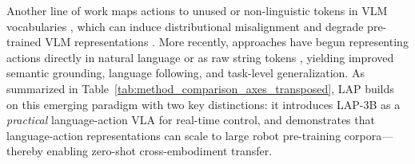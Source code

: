 Another line of work maps actions to unused or non-linguistic tokens in VLM vocabularies \cite{brohan2023rt2visionlanguageactionmodelstransfer, kim2024openvlaopensourcevisionlanguageactionmodel, pertsch2025fastefficientactiontokenization, liu2025fasterefficientautoregressivevision}, which can induce distributional misalignment and degrade pre-trained VLM representations \cite{hancock2025actionslanguagefinetuningvlms}. More recently, approaches have begun representing actions directly in natural language \cite{hancock2025actionslanguagefinetuningvlms} or as raw string tokens \cite{goyal2025vla0buildingstateoftheartvlas, grover2025enhancinggeneralizationvisionlanguageactionmodels}, yielding improved semantic grounding, language following, and task-level generalization. As summarized in Table~\ref{tab:method_comparison_axes_transposed}, LAP builds on this emerging paradigm with two key distinctions: it introduces LAP-3B as a \emph{practical} language-action VLA for real-time control, and demonstrates that language-action representations can scale to large robot pre-training corpora—thereby enabling zero-shot cross-embodiment transfer.

